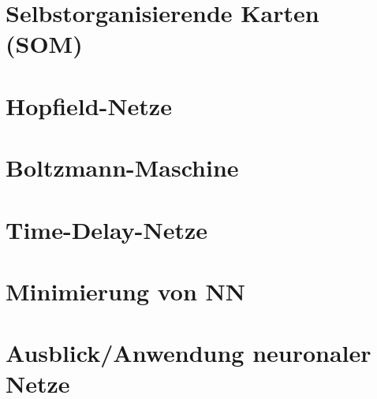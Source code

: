 \documentclass[fleqn,10pt]{SelfArx} %
\begin{document}
\section{Selbstorganisierende Karten (SOM)}

\section{Hopfield-Netze}

\section{Boltzmann-Maschine}

\section{Time-Delay-Netze}

\section{Minimierung von NN}

\section{Ausblick/Anwendung neuronaler Netze}
\end{document}
